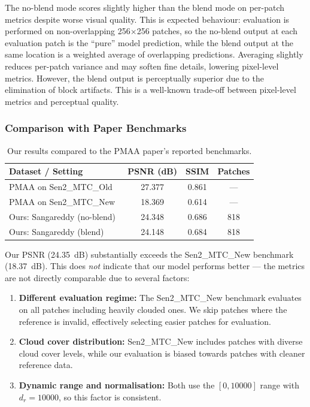 \documentclass[12pt,a4paper]{article}
\begin{document}
The no-blend mode scores slightly higher than the blend mode on per-patch metrics despite worse visual quality. This is expected behaviour: evaluation is performed on non-overlapping 256$\times$256 patches, so the no-blend output at each evaluation patch is the ``pure'' model prediction, while the blend output at the same location is a weighted average of overlapping predictions. Averaging slightly reduces per-patch variance and may soften fine details, lowering pixel-level metrics. However, the blend output is perceptually superior due to the elimination of block artifacts. This is a well-known trade-off between pixel-level metrics and perceptual quality.

\subsubsection{Comparison with Paper Benchmarks}

\begin{table}[H]
\centering
\caption{Our results compared to the PMAA paper's reported benchmarks.}
\label{tab:comparison}
\begin{tabular}{lccc}
\toprule
\textbf{Dataset / Setting} & \textbf{PSNR (dB)} & \textbf{SSIM} & \textbf{Patches} \\
\midrule
PMAA on Sen2\_MTC\_Old~\cite{zou2023pmaa} & 27.377 & 0.861 & --- \\
PMAA on Sen2\_MTC\_New~\cite{zou2023pmaa} & 18.369 & 0.614 & --- \\
\midrule
Ours: Sangareddy (no-blend) & 24.348 & 0.686 & 818 \\
Ours: Sangareddy (blend) & 24.148 & 0.684 & 818 \\
\bottomrule
\end{tabular}
\end{table}

Our PSNR (24.35~dB) substantially exceeds the Sen2\_MTC\_New benchmark (18.37~dB). This does \textit{not} indicate that our model performs better --- the metrics are not directly comparable due to several factors:

\begin{enumerate}[leftmargin=2em]
    \item \textbf{Different evaluation regime:} The Sen2\_MTC\_New benchmark evaluates on all patches including heavily clouded ones. We skip patches where the reference is invalid, effectively selecting easier patches for evaluation.
    \item \textbf{Cloud cover distribution:} Sen2\_MTC\_New includes patches with diverse cloud cover levels, while our evaluation is biased towards patches with cleaner reference data.
    \item \textbf{Dynamic range and normalisation:} Both use the $[0, 10000]$ range with $d_r = 10000$, so this factor is consistent.
\end{enumerate}
\end{document}
